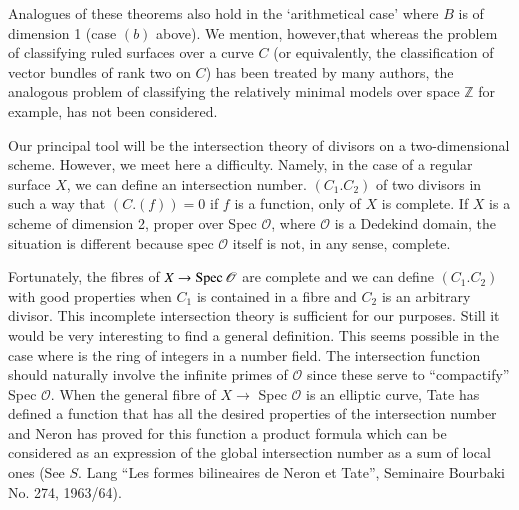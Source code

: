 Analogues of these theorems also hold in the `arithmetical case'
where $B$ is of dimension 1 (case $(b)$ above). We mention,
however,\pageoriginale that whereas the problem of classifying ruled
surfaces over a 
curve $C$ (or equivalently, the classification of vector bundles of
rank two on $C$) has been treated by many authors, the analogous
problem of classifying the relatively minimal models over space
$\mathbb{Z}$ for example, has not been considered. 

Our principal tool will be the intersection theory of divisors on a
two-dimensional scheme. However, we meet here a difficulty. Namely, in
the case of a regular surface $X$, we can define an intersection
number. $(C_1. C_2)$ of two divisors in such a way that $(C.(f)) = 0$ if
$f$ is a function, only of $X$ is complete. If $X$ is a scheme of
dimension 2, proper over Spec $\mathscr{O}$, where $\mathscr{O}$ is
a Dedekind domain, the situation is different because spec
$\mathscr{O}$ itself is not, in any sense, complete. 

Fortunately, the fibres of $X \rightarrow \operatorname{Spec} \mathscr{O}$ are
complete and we  can define $(C_1.C_2)$ with good properties when $C_1$
is contained in a fibre and $C_2$ is an arbitrary divisor. This
incomplete intersection theory is sufficient for our purposes. Still
it would be very interesting to find a general definition. This seems
possible in the case where is the ring of integers in a number
field. The intersection function should naturally involve the infinite
primes of $\mathscr{O}$ since these serve to ``compactify'' Spec
$\mathscr{O}$. When the general fibre of $X\rightarrow$ Spec
$\mathscr{O}$ is an elliptic curve, Tate has defined a function that
has all the desired properties of the intersection number and Neron
has proved for this function a product formula which can be considered
as an expression of the global intersection  number as a sum of local
ones (See $S$. Lang ``Les formes  bilineaires de Neron et Tate'',
Seminaire Bourbaki No. 274, 1963/64).  
